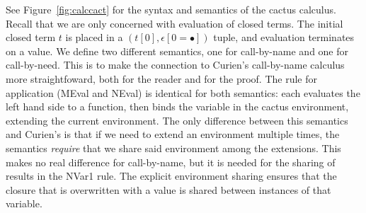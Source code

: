 See Figure~\ref{fig:calccact} for the syntax and semantics of the cactus
calculus. Recall that we are only concerned with evaluation of closed terms. The
initial closed term $t$ is placed in a $(t[0],\epsilon[0=\bullet])$ tuple, and
evaluation terminates on a value. We define two different semantics, one for
call-by-name and one for call-by-need. This is to make the connection to
Curien's call-by-name calculus more straightfoward, both for the reader and
for the proof. The rule for application (MEval and NEval) is identical for
both semantics: each evaluates the left hand side to a function, then binds
the variable in the cactus environment, extending the current environment.
The only difference between this semantics and Curien's is that if we need
to extend an environment multiple times, the semantics \emph{require}
that we share said environment among the extensions. This makes no real
difference for call-by-name, but it is needed for the sharing of results in the
NVar1 rule. The explicit environment sharing ensures that the closure that is
overwritten with a value is shared between instances of that variable. 


